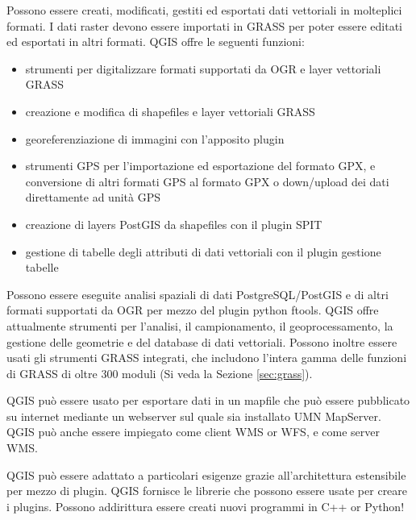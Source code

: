 
Possono essere creati, modificati, gestiti ed esportati dati vettoriali
in molteplici formati. I dati raster devono essere importati in GRASS
per poter essere editati ed esportati in altri formati. QGIS offre
le seguenti funzioni:
\begin{itemize}
\item strumenti per digitalizzare formati supportati da OGR e layer vettoriali GRASS
\item creazione e modifica di shapefiles e layer vettoriali GRASS 
\item georeferenziazione di immagini con l'apposito plugin 
\item strumenti GPS per l'importazione ed esportazione del formato GPX, e conversione di altri formati GPS al formato GPX o down/upload dei dati direttamente ad unità GPS
\item creazione di layers PostGIS da shapefiles con il plugin SPIT 
\item gestione di tabelle degli attributi di dati vettoriali con il plugin gestione tabelle
\end{itemize}


Possono essere eseguite analisi spaziali di dati PostgreSQL/PostGIS e di altri
formati supportati da OGR per mezzo del plugin python ftools. QGIS
offre attualmente strumenti per l'analisi, il campionamento, il geoprocessamento,
la gestione delle geometrie e del database di dati vettoriali. Possono
inoltre essere usati gli strumenti GRASS integrati, che includono
l'intera gamma delle funzioni di GRASS di oltre 300 moduli (Si veda la Sezione \ref{sec:grass}).


QGIS può essere usato per esportare dati in un mapfile che può essere
pubblicato su internet mediante un webserver sul quale sia installato
UMN MapServer. QGIS può anche essere impiegato come client WMS or
WFS, e come server WMS. 


QGIS può essere adattato a particolari esigenze grazie all'architettura
estensibile per mezzo di plugin. QGIS fornisce le librerie che possono
essere usate per creare i plugins. Possono addirittura essere creati
nuovi programmi in C++ or Python!

